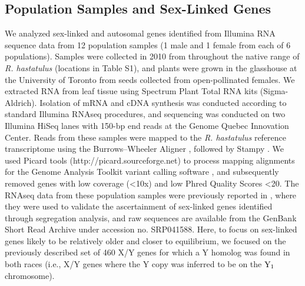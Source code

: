 \documentclass[9pt,twocolumn,twoside]{gsajnl}
\begin{document}
\subsection*{Population Samples and Sex-Linked Genes}
We analyzed sex-linked and autosomal genes identified from Illumina RNA sequence data from 12 population samples (1 male and 1 female from each of 6 populations). Samples were collected in 2010 from throughout the native range of \textit{R. hastatulus} (locations in Table S1), and plants were grown in the glasshouse at the University of Toronto from seeds collected from open-pollinated females. We extracted RNA from leaf tissue using Spectrum Plant Total RNA kits (Sigma-Aldrich). Isolation of mRNA and cDNA synthesis was conducted according to standard Illumina RNAseq procedures, and sequencing was conducted on two Illumina HiSeq lanes with 150-bp end reads at the Genome Quebec Innovation Center. Reads from these samples were mapped to the \textit{R. hastatulus} reference transcriptome \citep{hough2014} using the Burrows–Wheeler Aligner \citep{li2010fast}, followed by Stampy \citep{lunter2011stampy}. We used Picard tools (http://picard.sourceforge.net) to process mapping alignments for the Genome Analysis Toolkit variant calling software \citep{mckenna2010genome}, and subsequently removed genes with low coverage (<10x) and low Phred Quality Scores <20. The RNAseq data from these population samples were previously reported in \citet{hough2014}, where they were used to validate the ascertainment of sex-linked genes identified through segregation analysis, and raw sequences are available from the GenBank Short Read Archive under accession no. SRP041588. Here, to focus on sex-linked genes likely to be relatively older and closer to equilibrium, we focused on the previously described set of 460 X/Y genes for which a Y homolog was found in both races (i.e., X/Y genes where the Y copy was inferred to be on the $\textnormal{Y}_\textnormal{1}$ chromosome).
\end{document}

